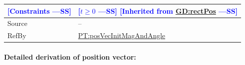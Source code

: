 \documentclass[12pt]{article}
\newcommand{\authornote}[3]{\textcolor{#1}{[#3 ---#2]}}
\newcommand{\authornote}[3]{}
\newcommand{\wss}[1]{\authornote{blue}{SS}{#1}}
\begin{document}
\begin{minipage}{\textwidth}
\begin{tabular}{>{\raggedright}p{}>{\raggedright\arraybackslash}p{}}
              \\ \midrule
\wss{Constraints} & \wss{$t \geq 0$} \wss{Inherited from
\hyperref[GD:rectPos]{GD:rectPos}}

\\ \midrule
Source & --
         
\\ \midrule
RefBy & \hyperref[PT:posVecInitMagAndAngle]{PT:posVecInitMagAndAngle} 
        
\\ \bottomrule
\end{tabular}
\end{minipage}

\paragraph{Detailed derivation of position vector:}
\label{GD:posVecDeriv}
\end{document}
